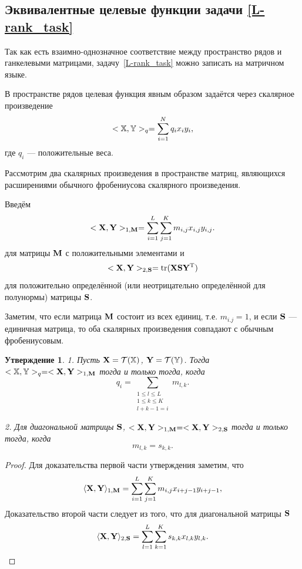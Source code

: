 \documentclass[12pt,a4paper,fleqn,leqno]{article}
\DeclareMathOperator{\tr}{tr}
\newtheorem{proposition}{Утверждение}%
\begin{document}
\subsection{Эквивалентные целевые функции задачи \eqref{L-rank_task}}

Так как есть взаимно-однозначное соответствие между пространство рядов и ганкелевыми матрицами,
задачу~\eqref{L-rank_task} можно записать на матричном языке.

В пространстве рядов целевая функция явным образом задаётся через скалярное произведение
\begin{equation}
\label{eq:norm_ser}
    <\mathbb{X},\mathbb{Y}>_q = \sum_{i = 1}^N q_i x_i y_i,
\end{equation}
где $q_i$ --- положительные веса.

Рассмотрим два скалярных произведения в пространстве матриц, являющихся расширениями
обычного фробениусова скалярного произведения.

Введём
\begin{equation}
\label{eq:norm1M}
    <\mathbf{X},\mathbf{Y}>_{1,\mathbf{M}} = \sum_{i = 1}^L \sum_{j=1}^K m_{i,j} x_{i,j} y_{i,j}.
\end{equation}
для матрицы $\mathbf{M}$ с положительными элементами и 
\begin{equation}
\label{eq:norm2S}
    <\bfX,\bfY>_{2,\bfS} = \tr(\bfX \bfS \bfY^\rmT)
\end{equation}
для положительно определённой (или неотрицательно определённой для полунормы) матрицы $\mathbf{S}$.

Заметим, что если матрица $\mathbf{M}$ состоит из всех единиц, т.е. $m_{i.j}=1$,
и если $\mathbf{S}$ --- единичная матрица, то оба скалярных произведения совпадают
с обычным фробениусовым.

\begin{proposition}
1. Пусть $\mathbf{X} = \mathcal{T}(\mathbb{X})$,  $\mathbf{Y} = \mathcal{T}(\mathbb{Y})$. Тогда $<\mathbb{X},\mathbb{Y}>_q= <\mathbf{X},\mathbf{Y}>_{1,\mathbf{M}}$ тогда и только тогда, когда
\begin{equation}\label{qi_mi}
q_i = \sum_{\substack{1 \le l \le L \\ 1 \le k \le K \\ l+k-1=i}} m_{l,k}.
\end{equation}

2. Для диагональной матрицы $\mathbf{S}$, $<\mathbf{X},\mathbf{Y}>_{1,\mathbf{M}}= <\mathbf{X},\mathbf{Y}>_{2,\mathbf{S}}$ тогда и только тогда, когда
\begin{equation}\label{sk_mlk}
m_{l,k}=s_{k,k}.
\end{equation}
\end{proposition}
\begin{proof}
Для доказательства первой части утверждения заметим, что
\begin{equation*}
\langle \mathbf{X}, \mathbf{Y} \rangle_{1,\mathbf{M}} = \sum_{i = 1}^L \sum_{j = 1}^K m_{i,j} x_{i + j - 1} y_{i + j - 1},
\end{equation*}
Доказательство второй части следует из того, что для диагональной матрицы $\mathbf{S}$
\begin{equation*}
\langle \mathbf{X}, \mathbf{Y} \rangle_{2,\mathbf{S}} = \sum_{l=1}^L \sum_{k=1}^K s_{k,k} x_{l,k} y_{l, k}.
\end{equation*}
\end{proof}
\end{document}
